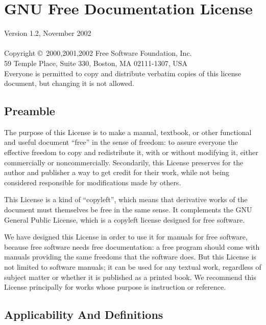 \chapter{GNU Free Documentation License}
\hypertarget{cha:Licenses:GFDL}{}
\label{cha:Licenses:GFDL}

Version 1.2, November 2002
\\
\\
Copyright \copyright\ 2000,2001,2002 Free Software Foundation, Inc.  
\\
59 Temple Place, Suite 330, Boston, MA  02111-1307, USA
\\
Everyone is permitted to copy and distribute verbatim copies of this
license document, but changing it is not allowed.

\section*{Preamble}
\label{sec:License-GFDL-0}

The purpose of this License is to make a manual, textbook, or other
functional and useful document ``free'' in the sense of freedom: to
assure everyone the effective freedom to copy and redistribute it,
with or without modifying it, either commercially or noncommercially.
Secondarily, this License preserves for the author and publisher a way
to get credit for their work, while not being considered responsible
for modifications made by others.

This License is a kind of ``copyleft'', which means that derivative
works of the document must themselves be free in the same sense.  It
complements the GNU General Public License, which is a copyleft
license designed for free software.

We have designed this License in order to use it for manuals for free
software, because free software needs free documentation: a free
program should come with manuals providing the same freedoms that the
software does.  But this License is not limited to software manuals;
it can be used for any textual work, regardless of subject matter or
whether it is published as a printed book.  We recommend this License
principally for works whose purpose is instruction or reference.

\section{Applicability And Definitions}
\label{sec:License-GFDL-1}

